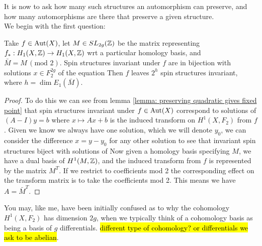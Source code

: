 \documentclass{article}
\begin{document}
It is now to ask how many such structures an automorphism can preserve, and how many automorphisms are there that preserve a given structure.\\
We begin with the first question:
\begin{theorem}
	Take $f \in \operatorname{Aut}(X)$, let $M \in SL_{2g}(\mathbb{Z})$ be the matrix representing $f_\ast : H_1(X,\mathbb{Z}) \to H_1(X, \mathbb{Z})$ wrt a particular homology basis, and $\bar{M}=M \, (\text{mod }2)$. Spin structures invariant under $f$ are in bijection with solutions $x \in F_2^{2g}$ of the equation 
Then $f$ leaves $2^h$ spin structures invariant, where $h = \dim E_1(\bar{M})$. 
\end{theorem}
\begin{proof}
 To do this we can see from lemma \ref{lemma: preserving quadratic gives fixed point} that spin structures invariant under $f \in \operatorname{Aut}(X)$ correspond to solutions of $(A-I)y=b$ where $x \mapsto Ax+b$ is the induced transform on $H^1(X,F_2)$ from $f$. Given we know we always have one solution, which we will denote $y_0$, we can consider the difference $x=y-y_0$ for any other solution to see that invariant spin structures biject with solutions of 
Now given a homology basis specifying $M$, we have a dual basis of $H^1(M,\mathbb{Z})$, and the induced transform from $f$ is represented by the matrix $M^T$. If we restrict to coefficients mod 2 the corresponding effect on the transform matrix is to take the coefficients mod 2. This means we have $A = \bar{M}^T$. 
\end{proof}
\begin{remark}
	You may, like me, have been initially confused as to why the cohomology $H^1(X,F_2)$ has dimension $2g$, when we typically think of a cohomology basis as being a basis of $g$ differentials. \hl{different type of cohomology? or differentials we ask to be abelian}. 
\end{remark} 
\end{document}

